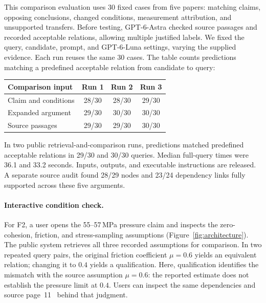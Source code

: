 \documentclass[sigconf,screen,review]{acmart}
\begin{document}
This comparison evaluation uses 30 fixed cases from five papers: matching claims, opposing conclusions, changed conditions, measurement attribution, and unsupported transfers. Before testing, GPT-6-Astra checked source passages and recorded acceptable relations, allowing multiple justified labels. We fixed the query, candidate, prompt, and GPT-6-Luna settings, varying the supplied evidence. Each run reuses the same 30 cases. The table counts predictions matching a predefined acceptable relation from candidate to query:
\begin{center}\small
\begin{tabular}{@{}lccc@{}}
\toprule
Comparison input & Run 1 & Run 2 & Run 3\\
\midrule
Claim and conditions & 28/30 & 28/30 & 29/30\\
Expanded argument & 29/30 & 30/30 & 30/30\\
Source passages & 29/30 & 29/30 & 30/30\\
\bottomrule
\end{tabular}
\end{center}
In two public retrieval-and-comparison runs, predictions matched predefined acceptable relations in 29/30 and 30/30 queries. Median full-query times were 36.1 and 33.2 seconds. Inputs, outputs, and executable instructions are released. A separate source audit found 28/29 nodes and 23/24 dependency links fully supported across these five arguments.

\paragraph{Interactive condition check.}
For F2, a user opens the 55--57\,MPa pressure claim and inspects the zero-cohesion, friction, and stress-sampling assumptions (Figure~\ref{fig:architecture}). The public system retrieves all three recorded assumptions for comparison. In two repeated query pairs, the original friction coefficient $\mu=0.6$ yields an equivalent relation; changing it to $0.4$ yields a qualification. Here, qualification identifies the mismatch with the source assumption $\mu=0.6$: the reported estimate does not establish the pressure limit at $0.4$. Users can inspect the same dependencies and source page~11~\cite{asmari} behind that judgment.
\end{document}

